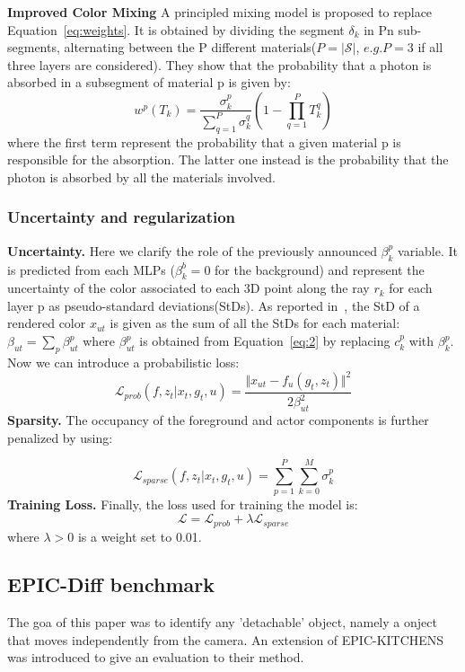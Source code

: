  \textbf{Improved Color Mixing}
A principled mixing model is proposed to replace Equation~\ref{eq:weights}. It is obtained
by dividing the segment $\delta_k$ in Pn sub-segments, alternating between the P different
materials($P = \vert \mathcal{S}\vert$, $e.g. P = 3$ if all three layers are considered).
They show that the probability that a photon is absorbed in a subsegment of material p
is given by:
\begin{equation}
    w^p(T_k) = \frac{\sigma_k^p}{\sum_{q=1}^P \sigma_k^q} (1-\prod_{q=1}^{P} T_k^q)
\end{equation}
where the first term represent the probability that a given material p is responsible
for the absorption. The latter one instead is the probability that the photon is absorbed by all 
the materials involved.

\subsubsection{Uncertainty and regularization}
\textbf{Uncertainty.} Here we clarify the role of the previously announced $\beta_k^p$ variable.
It is predicted from each MLPs ($\beta_k^b = 0$ for the background) and represent the uncertainty
of the color associated to each 3D point along the ray $r_k$ for each layer p as pseudo-standard
deviations(StDs). As reported in~\cite{ndiff_17}, the StD of a rendered color $x_{ut}$ is given
as the sum of all the StDs for each material: $\beta_{ut} = \sum_{p} \beta_{u t}^p$ where 
$\beta_{u t}^p$ is obtained from Equation~\ref{eq:2} by replacing $c_k^p$ with $\beta_k^p$.
Now we can introduce a probabilistic loss:
\begin{equation}
    \mathcal{L}_{prob}(f,z_t \vert x_t, g_t,u) = \frac{\Vert x_{ut} - f_u(g_t,z_t)\Vert^2}{2 \beta_{ut}^2}
\end{equation}
\textbf{Sparsity.} The occupancy of the foreground and actor components is further penalized
by using:

\begin{equation}
    \mathcal{L}_{sparse}(f,z_t \vert x_t, g_t,u) = \sum_{p=1}^{P}\sum_{k=0}^{M} \sigma_k^p
\end{equation}
\textbf{Training Loss.} Finally, the loss used for training the model is:
\begin{equation}
    \mathcal{L} = \mathcal{L}_{prob}+\lambda \mathcal{L}_{sparse}
\end{equation}
where $\lambda>0$ is a weight set to 0.01.

\subsection{EPIC-Diff benchmark}
The goa of this paper was to identify any 'detachable' object, namely a onject that moves independently
from the camera. An extension of EPIC-KITCHENS~\cite{EPICKITCHENS} was introduced to give an evaluation to their method.

